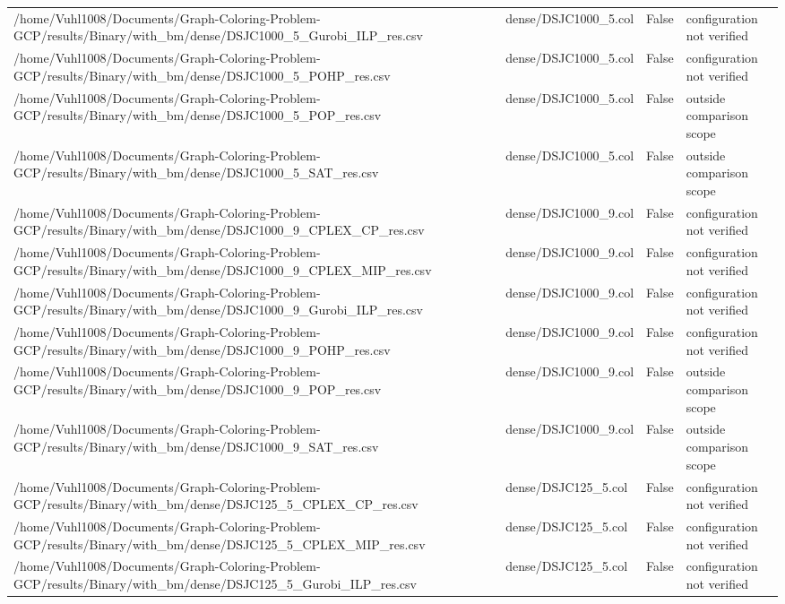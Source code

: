 \begin{table}[htbp]
\begin{tabular}{llll}
/home/Vuhl1008/Documents/Graph-Coloring-Problem-GCP/results/Binary/with\_bm/dense/DSJC1000\_5\_Gurobi\_ILP\_res.csv & dense/DSJC1000\_5.col & False & configuration not verified \\
/home/Vuhl1008/Documents/Graph-Coloring-Problem-GCP/results/Binary/with\_bm/dense/DSJC1000\_5\_POHP\_res.csv & dense/DSJC1000\_5.col & False & configuration not verified \\
/home/Vuhl1008/Documents/Graph-Coloring-Problem-GCP/results/Binary/with\_bm/dense/DSJC1000\_5\_POP\_res.csv & dense/DSJC1000\_5.col & False & outside comparison scope \\
/home/Vuhl1008/Documents/Graph-Coloring-Problem-GCP/results/Binary/with\_bm/dense/DSJC1000\_5\_SAT\_res.csv & dense/DSJC1000\_5.col & False & outside comparison scope \\
/home/Vuhl1008/Documents/Graph-Coloring-Problem-GCP/results/Binary/with\_bm/dense/DSJC1000\_9\_CPLEX\_CP\_res.csv & dense/DSJC1000\_9.col & False & configuration not verified \\
/home/Vuhl1008/Documents/Graph-Coloring-Problem-GCP/results/Binary/with\_bm/dense/DSJC1000\_9\_CPLEX\_MIP\_res.csv & dense/DSJC1000\_9.col & False & configuration not verified \\
/home/Vuhl1008/Documents/Graph-Coloring-Problem-GCP/results/Binary/with\_bm/dense/DSJC1000\_9\_Gurobi\_ILP\_res.csv & dense/DSJC1000\_9.col & False & configuration not verified \\
/home/Vuhl1008/Documents/Graph-Coloring-Problem-GCP/results/Binary/with\_bm/dense/DSJC1000\_9\_POHP\_res.csv & dense/DSJC1000\_9.col & False & configuration not verified \\
/home/Vuhl1008/Documents/Graph-Coloring-Problem-GCP/results/Binary/with\_bm/dense/DSJC1000\_9\_POP\_res.csv & dense/DSJC1000\_9.col & False & outside comparison scope \\
/home/Vuhl1008/Documents/Graph-Coloring-Problem-GCP/results/Binary/with\_bm/dense/DSJC1000\_9\_SAT\_res.csv & dense/DSJC1000\_9.col & False & outside comparison scope \\
/home/Vuhl1008/Documents/Graph-Coloring-Problem-GCP/results/Binary/with\_bm/dense/DSJC125\_5\_CPLEX\_CP\_res.csv & dense/DSJC125\_5.col & False & configuration not verified \\
/home/Vuhl1008/Documents/Graph-Coloring-Problem-GCP/results/Binary/with\_bm/dense/DSJC125\_5\_CPLEX\_MIP\_res.csv & dense/DSJC125\_5.col & False & configuration not verified \\
/home/Vuhl1008/Documents/Graph-Coloring-Problem-GCP/results/Binary/with\_bm/dense/DSJC125\_5\_Gurobi\_ILP\_res.csv & dense/DSJC125\_5.col & False & configuration not verified \\

\end{tabular}
\end{table}
